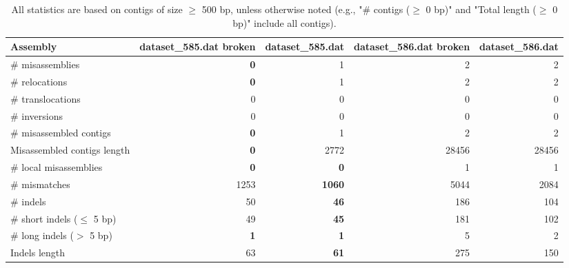 \documentclass[12pt,a4paper]{article}
\begin{document}
\begin{table}[ht]
\begin{center}
\caption{All statistics are based on contigs of size $\geq$ 500 bp, unless otherwise noted (e.g., "\# contigs ($\geq$ 0 bp)" and "Total length ($\geq$ 0 bp)" include all contigs).}
\begin{tabular}{|l*{4}{|r}|}
\hline
Assembly & dataset\_585.dat broken & dataset\_585.dat & dataset\_586.dat broken & dataset\_586.dat \\ \hline
\# misassemblies & {\bf 0} & 1 & 2 & 2 \\ \hline
\hspace{5mm}\# relocations & {\bf 0} & 1 & 2 & 2 \\ \hline
\hspace{5mm}\# translocations & 0 & 0 & 0 & 0 \\ \hline
\hspace{5mm}\# inversions & 0 & 0 & 0 & 0 \\ \hline
\# misassembled contigs & {\bf 0} & 1 & 2 & 2 \\ \hline
Misassembled contigs length & {\bf 0} & 2772 & 28456 & 28456 \\ \hline
\# local misassemblies & {\bf 0} & {\bf 0} & 1 & 1 \\ \hline
\# mismatches & 1253 & {\bf 1060} & 5044 & 2084 \\ \hline
\# indels & 50 & {\bf 46} & 186 & 104 \\ \hline
\hspace{5mm}\# short indels ($\leq$ 5 bp) & 49 & {\bf 45} & 181 & 102 \\ \hline
\hspace{5mm}\# long indels ($>$ 5 bp) & {\bf 1} & {\bf 1} & 5 & 2 \\ \hline
Indels length & 63 & {\bf 61} & 275 & 150 \\ \hline
\end{tabular}
\end{center}
\end{table}
\end{document}
